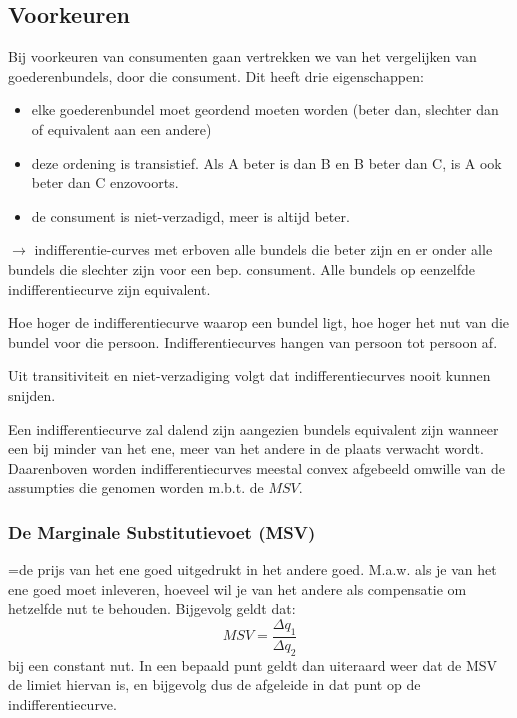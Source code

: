\subsection{Voorkeuren}
Bij voorkeuren van consumenten gaan vertrekken we van het vergelijken van goederenbundels, door die consument. Dit heeft drie eigenschappen:
\begin{itemize}
	\item elke goederenbundel moet geordend moeten worden (beter dan, slechter dan of equivalent aan een andere)
    \item deze ordening is transistief. Als A beter is dan B en B beter dan C, is A ook beter dan C enzovoorts.
    \item de consument is niet-verzadigd, meer is altijd beter.
\end{itemize}

$\rightarrow$ indifferentie-curves met erboven alle bundels die beter zijn en er onder alle bundels die slechter zijn voor een bep. consument. Alle bundels op eenzelfde indifferentiecurve zijn equivalent.

Hoe hoger de indifferentiecurve waarop een bundel ligt, hoe hoger het nut van die bundel voor die persoon. Indifferentiecurves hangen van persoon tot persoon af.

Uit transitiviteit en niet-verzadiging volgt dat indifferentiecurves nooit kunnen snijden.

Een indifferentiecurve zal dalend zijn aangezien bundels equivalent zijn wanneer een bij minder van het ene, meer van het andere in de plaats verwacht wordt. Daarenboven worden indifferentiecurves meestal convex afgebeeld omwille van de assumpties die genomen worden m.b.t. de $MSV$.

\subsubsection{De Marginale Substitutievoet (MSV)}
\label{sssec:deMarginaleSubstitutievoet}
=de prijs van het ene goed uitgedrukt in het andere goed. M.a.w. als je van het ene goed moet inleveren, hoeveel wil je van het andere als compensatie om hetzelfde nut te behouden. Bijgevolg geldt dat:
\begin{equation}
	MSV = \frac{\Delta q_1}{\Delta q_2}
\end{equation}
bij een constant nut. In een bepaald punt geldt dan uiteraard weer dat de MSV de limiet hiervan is, en bijgevolg dus de afgeleide in dat punt op de indifferentiecurve.

